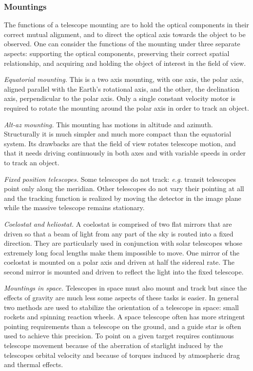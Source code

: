 \subsubsection{Mountings}

The functions of a telescope mounting are to hold the optical components 
in their correct mutual alignment, and to direct the optical axis towards the
object to be observed. One can consider the functions of the mounting under 
three separate aspects: supporting the optical components, preserving their 
correct spatial relationship, and acquiring and holding the object of interest 
in the field of view.

\noindent
{\it Equatorial mounting.} This is a two axis mounting, with one axis, the polar axis,
aligned parallel with the Earth's rotational axis, and the other, the declination axis,
perpendicular to the polar axis. Only a single constant velocity motor is required 
to rotate the mounting around the polar axis in order to track an object.

\noindent
{\it Alt-az mounting.} This mounting has motions in altitude and azimuth. Structurally 
it is much simpler and much more compact than the equatorial system. Its drawbacks are 
that the field of view
rotates telescope motion, and that it needs driving continuously in both axes and with 
variable speeds in order to track an object. 

\noindent
{\it Fixed position telescopes.} Some telescopes do not track: {\it e.g.} transit telescopes
point only along the meridian. Other telescopes do not vary their pointing at all and
the tracking function is realized by moving the detector in the image plane while the 
massive telescope remains stationary.

\noindent
{\it Coelostat and heliostat.} A coelostat is comprised of two flat mirrors that are driven 
so that a beam of light from any part of the sky is routed into a fixed direction. They are
particularly used in conjunction with solar telescopes whose extremely long focal lengths
make them impossible to move. One mirror of the coelostat is mounted on a polar axis and
driven at half the sidereal rate. The second mirror is mounted and driven to reflect the light
into the fixed telescope.

\noindent
{\it Mountings in space.} Telescopes in space must also mount and track but since the 
effects of gravity are much less some aspects of these tasks is easier. In general two methods
are used to stabilize the orientation of a telescope in space: small rockets and spinning 
reaction wheels. A space telescope often has more stringent pointing requirements than
a telescope on the ground, and a guide star is often used to achieve this precision. To point
on a given target requires continuous telescope movement because of the aberration of 
starlight induced by the telescopes orbital velocity and because of torques induced by 
atmospheric drag and thermal effects. 

